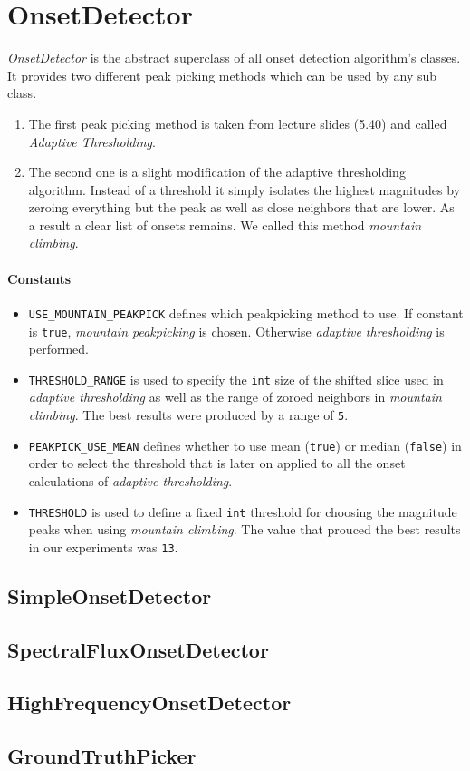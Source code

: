 \section{\ttfamily OnsetDetector}
\emph{OnsetDetector} is the abstract superclass of all onset detection
algorithm's classes. It provides two different peak picking methods which can be
used by any sub class.

\begin{enumerate}
  \item The first peak picking method is taken from lecture slides (5.40) and
  called \emph{Adaptive Thresholding}.
  \item The second one is a slight modification of the adaptive thresholding
  algorithm. Instead of a threshold it simply isolates the highest magnitudes by
  zeroing everything but the peak as well as close neighbors that are lower. As
  a result a clear list of onsets remains. We called this method \emph{mountain
  climbing}.
\end{enumerate}

\paragraph{Constants}
\begin{itemize}
  \item \texttt{USE\_MOUNTAIN\_PEAKPICK} defines which peakpicking method to
  use. If constant is \texttt{true}, \emph{mountain peakpicking} is chosen.
  Otherwise \emph{adaptive thresholding} is performed.
  \item \texttt{THRESHOLD\_RANGE} is used to specify the \texttt{int} size of
  the shifted slice used in \emph{adaptive thresholding} as well as the range of
  zoroed neighbors in \emph{mountain climbing}. The best results were produced
  by a range of \texttt{5}.
  \item \texttt{PEAKPICK\_USE\_MEAN} defines whether to use mean
  (\texttt{true}) or median (\texttt{false}) in order to select the threshold
  that is later on applied to all the onset calculations of \emph{adaptive
  thresholding}.
  \item \texttt{THRESHOLD} is used to define a fixed \texttt{int} threshold for
  choosing the magnitude peaks when using \emph{mountain climbing}. The value
  that prouced the best results in our experiments was \texttt{13}. 
\end{itemize}

\subsection{\ttfamily SimpleOnsetDetector}

\subsection{\ttfamily SpectralFluxOnsetDetector}

\subsection{\ttfamily HighFrequencyOnsetDetector}

\subsection{\ttfamily GroundTruthPicker}
